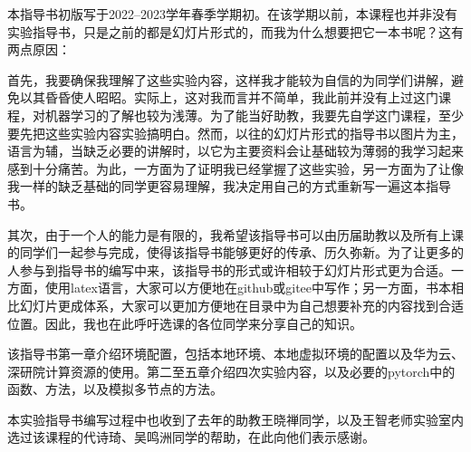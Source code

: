 


\hspace{2em}本指导书初版写于2022--2023学年春季学期初。在该学期以前，本课程也并非没有实验指导书，只是之前的都是幻灯片形式的，而我为什么想要把它一本书呢？这有两点原因：

\hspace{2em}首先，我要确保我理解了这些实验内容，这样我才能较为自信的为同学们讲解，避免以其昏昏使人昭昭。实际上，这对我而言并不简单，我此前并没有上过这门课程，对机器学习的了解也较为浅薄。为了能当好助教，我要先自学这门课程，至少要先把这些实验内容实验搞明白。然而，以往的幻灯片形式的指导书以图片为主，语言为辅，当缺乏必要的讲解时，以它为主要资料会让基础较为薄弱的我学习起来感到十分痛苦。为此，一方面为了证明我已经掌握了这些实验，另一方面为了让像我一样的缺乏基础的同学更容易理解，我决定用自己的方式重新写一遍这本指导书。

\hspace{2em}其次，由于一个人的能力是有限的，我希望该指导书可以由历届助教以及所有上课的同学们一起参与完成，使得该指导书能够更好的传承、历久弥新。为了让更多的人参与到指导书的编写中来，该指导书的形式或许相较于幻灯片形式更为合适。一方面，使用latex语言，大家可以方便地在github或gitee中写作；另一方面，书本相比幻灯片更成体系，大家可以更加方便地在目录中为自己想要补充的内容找到合适位置。因此，我也在此呼吁选课的各位同学来分享自己的知识。


\hspace{2em}该指导书第一章介绍环境配置，包括本地环境、本地虚拟环境的配置以及华为云、深研院计算资源的使用。第二至五章介绍四次实验内容，以及必要的pytorch中的函数、方法，以及模拟多节点的方法。

\hspace{2em}本实验指导书编写过程中也收到了去年的助教王晓禅同学，以及王智老师实验室内选过该课程的代诗琦、吴鸣洲同学的帮助，在此向他们表示感谢。

